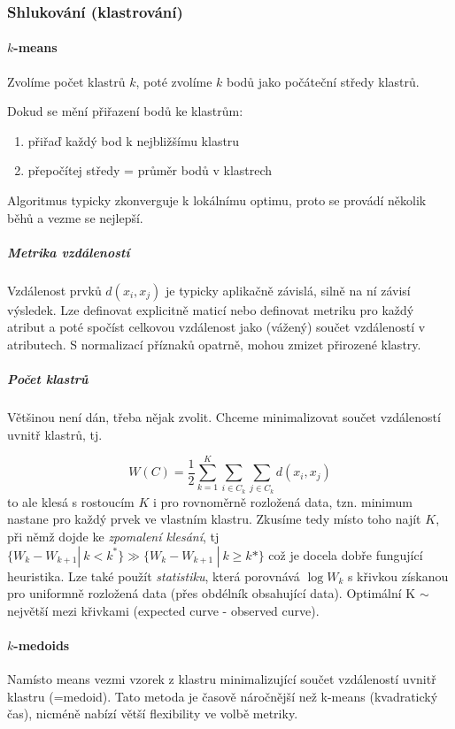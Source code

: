 \documentclass[11pt]{report} %
\numberwithin{equation}{section}
\begin{document}
\subsubsection{Shlukování (klastrování)}
\paragraph{$k$-means}
Zvolíme počet klastrů $k$, poté zvolíme $k$ bodů jako počáteční středy klastrů. 

Dokud se mění přiřazení bodů ke klastrům:
\begin{enumerate}
	\item přiřaď každý bod k nejbližšímu klastru
	\item přepočítej středy = průměr bodů v klastrech
\end{enumerate}
Algoritmus typicky zkonverguje k lokálnímu optimu, proto se provádí několik běhů a vezme se nejlepší.

\subparagraph{Metrika vzdáleností}
Vzdálenost prvků $d(x_i, x_j)$ je typicky aplikačně závislá, silně na ní závisí výsledek. Lze definovat explicitně maticí nebo definovat metriku pro každý atribut a poté spočíst celkovou vzdálenost jako (vážený) součet vzdáleností v atributech. S normalizací příznaků opatrně, mohou zmizet přirozené klastry.

\subparagraph{Počet klastrů}
Většinou není dán, třeba nějak zvolit. Chceme minimalizovat součet vzdáleností uvnitř klastrů, tj.

$$W(C) = \frac{1}{2} \sum_{k=1}^{K} \sum_{i \in C_k} \sum_{j \in C_k}  d(x_i, x_j)$$
to ale klesá s rostoucím $K$ i pro rovnoměrně rozložená data, tzn. minimum nastane pro každý prvek ve vlastním klastru. Zkusíme tedy místo toho najít $K$, při němž dojde ke \textit{zpomalení klesání}, tj
$\{W_k - W_{k+1} |\ k < k^* \} \gg \{W_{k} - W_{k+1}\ |\ k \geq k* \}$
což je docela dobře fungující heuristika. Lze také použít \textit{ statistiku}, která porovnává $\log W_k$ s křivkou získanou pro uniformně rozložená data (přes obdélník obsahující data). Optimální K $\sim$ největší  mezi křivkami (expected curve - observed curve). 

\paragraph{$k$-medoids}
Namísto means vezmi vzorek z klastru minimalizující součet vzdáleností uvnitř klastru (=medoid). Tato metoda je časově náročnější než k-means (kvadratický čas), nicméně nabízí větší flexibility ve volbě metriky.
\end{document}
